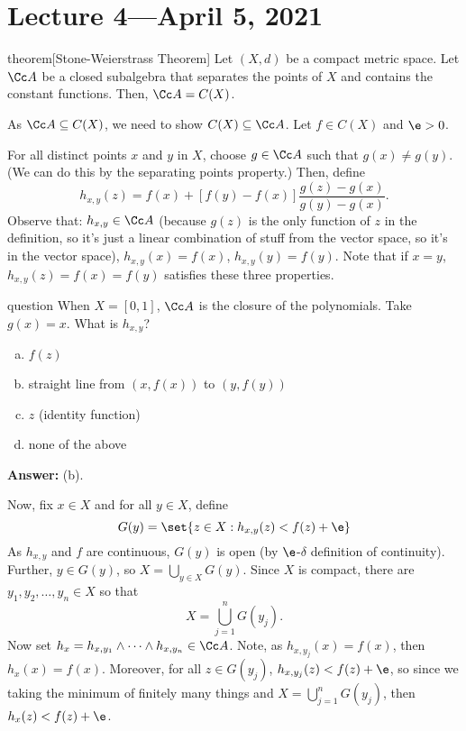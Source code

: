 \documentclass[class=article, crop=false]{standalone}
\begin{document}
\section{Lecture 4---April 5, 2021}

\begin{result}{theorem}[Stone-Weierstrass Theorem]
  Let $(X,d)$ be a compact metric space. Let $\Cc A$ be a closed subalgebra that separates the points of $X$ and contains the constant functions. Then, $\Cc A = C(X)$.
\end{result}

\begin{pf}
  As $\Cc A \subseteq C(X)$, we need to show $C(X) \subseteq \Cc A$. Let $f \in C(X)$ and $\e > 0$.

  For all distinct points $x$ and $y$ in $X$, choose $g \in \Cc A$ such that $g(x) \neq g(y)$. (We can do this by the separating points property.) Then, define
    \[
      h_{x,y}(z) = f(x) + [f(y)-f(x)] \frac{g(z)-g(x)}{g(y)-g(x)}.
    \]
  Observe that: $h_{x,y} \in \Cc A$ (because $g(z)$ is the only function of $z$ in the definition, so it's just a linear combination of stuff from the vector space, so it's in the vector space), $h_{x,y}(x)=f(x)$, $h_{x,y}(y) = f(y)$. Note that if $x = y$, $h_{x,y}(z) = f(x)=f(y)$ satisfies these three properties.

    \begin{understandingcheck}{question}
      When $X = [0,1]$, $\Cc A$ is the closure of the polynomials. Take $g(x) = x$. What is $h_{x,y}$?
        \begin{enumerate}[(a)]
          \item $f(z)$
          \item straight line from $(x,f(x))$ to $(y,f(y))$
          \item $z$ (identity function)
          \item none of the above
        \end{enumerate}

      \textbf{Answer:}  (b).
    \end{understandingcheck}

  Now, fix $x \in X$ and for all $y \in X$, define
    \[
      G(y) = \set{z \in X : h_{x,y}(z) < f(z) + \e}
    \]
  As $h_{x,y}$ and $f$ are continuous, $G(y)$ is open (by $\e$-$\delta$ definition of continuity). Further, $y \in G(y)$, so $X = \bigcup_{y \in X}^{} G(y)$. Since $X$ is compact, there are $y_1,y_2,\ldots,y_n \in X$ so that
    \[
      X = \bigcup_{j=1}^{n} G(y_j).
    \]
  Now set $h_x = h_{x,y_1} \land \cdots \land h_{x,y_n} \in \Cc A$. Note, as $h_{x,y_j}(x)=f(x)$, then $h_x(x) = f(x)$. Moreover, for all $z\in G(y_j)$, $h_{x,y_j}(z) < f(z)+\e$, so since we taking the minimum of finitely many things and $X = \bigcup_{j=1}^{n} G(y_j)$, then $h_x(z) < f(z)+\e$.


\end{pf}
\end{document}
